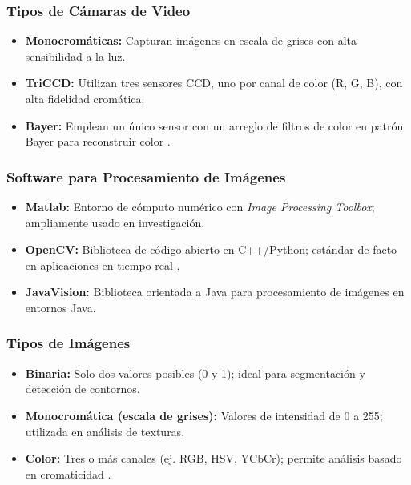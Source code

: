 \documentclass[12pt,letterpaper]{article}
\begin{document}
\subsubsection{Tipos de Cámaras de Video}

\begin{itemize}[leftmargin=1.5cm]
    \item \textbf{Monocromáticas:} Capturan imágenes en escala de grises con alta sensibilidad a la luz.
    \item \textbf{TriCCD:} Utilizan tres sensores CCD, uno por canal de color (R, G, B), con alta fidelidad cromática.
    \item \textbf{Bayer:} Emplean un único sensor con un arreglo de filtros de color en patrón Bayer para reconstruir color \citep{bayer1976color}.
\end{itemize}

\subsubsection{Software para Procesamiento de Imágenes}

\begin{itemize}[leftmargin=1.5cm]
    \item \textbf{Matlab:} Entorno de cómputo numérico con \textit{Image Processing Toolbox}; ampliamente usado en investigación.
    \item \textbf{OpenCV:} Biblioteca de código abierto en C++/Python; estándar de facto en aplicaciones en tiempo real \citep{bradski2008learning}.
    \item \textbf{JavaVision:} Biblioteca orientada a Java para procesamiento de imágenes en entornos Java.
\end{itemize}

\subsubsection{Tipos de Imágenes}

\begin{itemize}[leftmargin=1.5cm]
    \item \textbf{Binaria:} Solo dos valores posibles (0 y 1); ideal para segmentación y detección de contornos.
    \item \textbf{Monocromática (escala de grises):} Valores de intensidad de 0 a 255; utilizada en análisis de texturas.
    \item \textbf{Color:} Tres o más canales (ej. RGB, HSV, YCbCr); permite análisis basado en cromaticidad \citep{gonzalez2018digital}.
\end{itemize}
\end{document}
